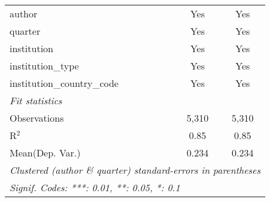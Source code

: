 \begin{tabular}{lcc}
   author                                   & Yes     & Yes\\  
   quarter                                  & Yes     & Yes\\  
   institution                              & Yes     & Yes\\  
   institution\_type                        & Yes     & Yes\\  
   institution\_country\_code               & Yes     & Yes\\  
   \midrule
   \emph{Fit statistics}\\
   Observations                             & 5,310   & 5,310\\  
   R$^2$                                    & 0.85    & 0.85\\  
Mean(Dep. Var.) & 0.234 & 0.234 \\
   \midrule \midrule
   \multicolumn{3}{l}{\emph{Clustered (author \& quarter) standard-errors in parentheses}}\\
   \multicolumn{3}{l}{\emph{Signif. Codes: ***: 0.01, **: 0.05, *: 0.1}}\\
\end{tabular}
\par\endgroup
